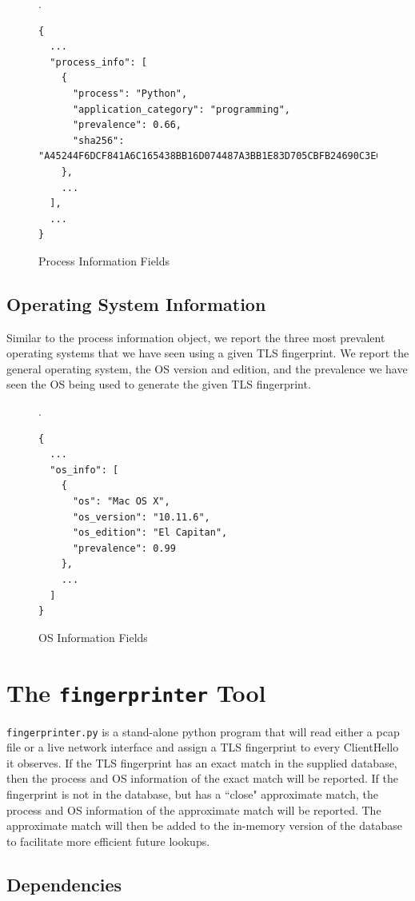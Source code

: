 \documentclass{book}
\begin{document}
\begin{figure}[H]\small
  \caption{Process Information Fields}
  \label{figure:schema-process}.
\begin{verbatim}
{
  ...
  "process_info": [
    {
      "process": "Python",
      "application_category": "programming",
      "prevalence": 0.66,
      "sha256": "A45244F6DCF841A6C165438BB16D074487A3BB1E83D705CBFB24690C3E09DCAE"
    },
    ...
  ],
  ...
}
\end{verbatim}
\end{figure}

\section{Operating System Information}

Similar to the process information object, we report the three most prevalent operating systems that we have seen using a given TLS fingerprint. We report the general operating system, the OS version and edition, and the prevalence we have seen the OS being used to generate the given TLS fingerprint.

\begin{figure}[H]\small
  \caption{OS Information Fields}
  \label{figure:schema-os}.
\begin{verbatim}
{
  ...
  "os_info": [
    {
      "os": "Mac OS X",
      "os_version": "10.11.6",
      "os_edition": "El Capitan",
      "prevalence": 0.99
    },
    ...
  ]
}
\end{verbatim}
\end{figure}


\chapter{The \texttt{fingerprinter} Tool}

\texttt{fingerprinter.py} is a stand-alone python program that will read either a pcap file or a live network interface and assign a TLS fingerprint to every ClientHello it observes. If the TLS fingerprint has an exact match in the supplied database, then the process and OS information of the exact match will be reported. If the fingerprint is not in the database, but has a ``close" approximate match, the process and OS information of the approximate match will be reported. The approximate match will then be added to the in-memory version of the database to facilitate more efficient future lookups.


\section{Dependencies}
\end{document}
